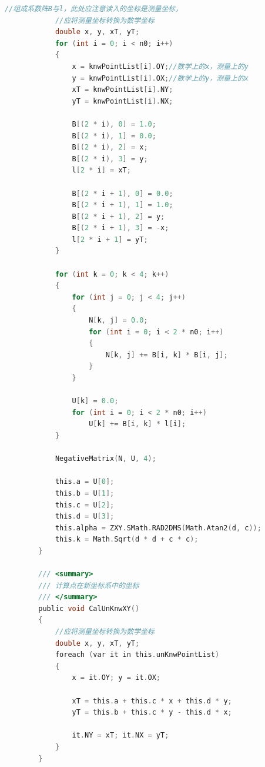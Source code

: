 \begin{lstlisting}[language=C]
            //组成系数阵B与l，此处应注意读入的坐标是测量坐标，
            //应将测量坐标转换为数学坐标
            double x, y, xT, yT;
            for (int i = 0; i < n0; i++)
            {
                x = knwPointList[i].OY;//数学上的x，测量上的y
                y = knwPointList[i].OX;//数学上的y，测量上的x
                xT = knwPointList[i].NY;
                yT = knwPointList[i].NX; 

                B[(2 * i), 0] = 1.0;
                B[(2 * i), 1] = 0.0;
                B[(2 * i), 2] = x;
                B[(2 * i), 3] = y;
                l[2 * i] = xT;

                B[(2 * i + 1), 0] = 0.0;
                B[(2 * i + 1), 1] = 1.0;
                B[(2 * i + 1), 2] = y; 
                B[(2 * i + 1), 3] = -x; 
                l[2 * i + 1] = yT;
            }

            for (int k = 0; k < 4; k++)
            {
                for (int j = 0; j < 4; j++)
                {
                    N[k, j] = 0.0;
                    for (int i = 0; i < 2 * n0; i++)
                    {
                        N[k, j] += B[i, k] * B[i, j];
                    }
                }

                U[k] = 0.0;
                for (int i = 0; i < 2 * n0; i++)
                    U[k] += B[i, k] * l[i];
            }

            NegativeMatrix(N, U, 4);

            this.a = U[0];
            this.b = U[1];
            this.c = U[2];
            this.d = U[3];
            this.alpha = ZXY.SMath.RAD2DMS(Math.Atan2(d, c));
            this.k = Math.Sqrt(d * d + c * c);
        }

        /// <summary>
        /// 计算点在新坐标系中的坐标
        /// </summary>
        public void CalUnKnwXY()
        {
            //应将测量坐标转换为数学坐标
            double x, y, xT, yT;
            foreach (var it in this.unKnwPointList)
            {
                x = it.OY; y = it.OX;

                xT = this.a + this.c * x + this.d * y;
                yT = this.b + this.c * y - this.d * x;

                it.NY = xT; it.NX = yT;
            }
        }


\end{lstlisting}
